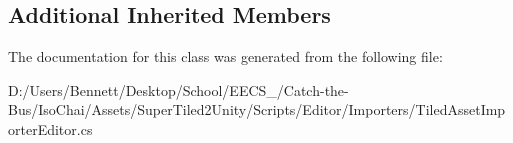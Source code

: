 \subsection*{Additional Inherited Members}


The documentation for this class was generated from the following file\+:\begin{DoxyCompactItemize}
\item 
D\+:/\+Users/\+Bennett/\+Desktop/\+School/\+E\+E\+C\+S\+\_/\+Catch-\/the-\/\+Bus/\+Iso\+Chai/\+Assets/\+Super\+Tiled2\+Unity/\+Scripts/\+Editor/\+Importers/Tiled\+Asset\+Importer\+Editor.\+cs\end{DoxyCompactItemize}

